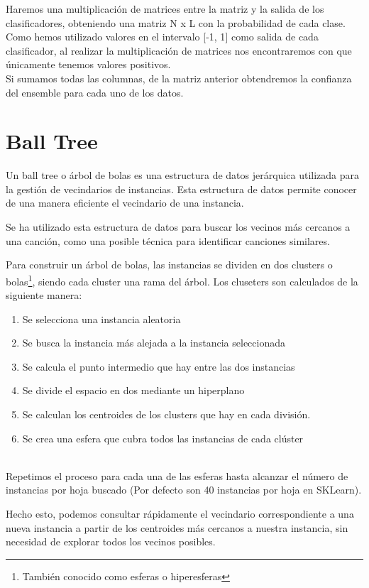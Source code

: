 Haremos una multiplicación de matrices entre la matriz y la salida de
los clasificadores, obteniendo una matriz N x L con la probabilidad de
cada clase. Como hemos utilizado valores en el intervalo {[}-1, 1{]}
como salida de cada clasificador, al realizar la multiplicación de
matrices nos encontraremos con que únicamente tenemos valores positivos.\\
Si sumamos todas las columnas, de la matriz anterior obtendremos la
confianza del ensemble para cada uno de los datos.


\section{Ball Tree}\label{ball_tree}
Un ball tree o árbol de bolas es una estructura de datos jerárquica utilizada para la gestión de vecindarios de instancias. Esta estructura de datos permite conocer de una manera eficiente el vecindario de una instancia.

Se ha utilizado esta estructura de datos para buscar los vecinos más cercanos a una canción, como una posible técnica para identificar canciones similares.

Para construir un árbol de bolas, las instancias se dividen en dos clusters o bolas\footnote{También conocido como esferas o hiperesferas}, siendo cada cluster una rama del árbol. Los cluseters son calculados de la siguiente manera:
\begin{enumerate}
    \item Se selecciona una instancia aleatoria
    \item Se busca la instancia más alejada a la instancia seleccionada
    \item Se calcula el punto intermedio que hay entre las dos instancias
    \item Se divide el espacio en dos mediante un hiperplano
    \item Se calculan los centroides de los clusters que hay en cada división.
    \item Se crea una esfera que cubra todos las instancias de cada clúster
\end{enumerate}\\
Repetimos el proceso para cada una de las esferas hasta alcanzar el número de instancias por hoja buscado (Por defecto son 40 instancias por hoja en SKLearn).

Hecho esto, podemos consultar rápidamente el vecindario correspondiente a una nueva instancia a partir de los centroides más cercanos a nuestra instancia, sin necesidad de explorar todos los vecinos posibles. 

